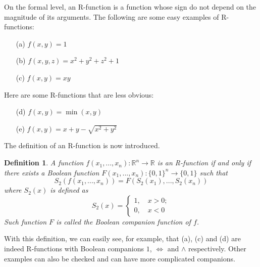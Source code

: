 \documentclass[11pt]{amsart}
\newtheorem{definition}{Definition}%
\theoremstyle{definition}
\begin{document}
On the formal level, an R-function is a function whose sign do not depend on the magnitude of its arguments.  The following are some easy  examples of R-functions: 
\begin{enumerate}
\item[(a)] $f(x,y) = 1$
\item[(b)] $f(x,y,z) = x^2+y^2+z^2+1$
\item[(c)] $f(x,y) = xy$
\end{enumerate}
Here are some R-functions that are less obvious:
\begin{enumerate}
\item[(d)] $f(x,y) = \min(x,y)$
\item[(e)] $f(x,y) = x+y-\sqrt{x^2+y^2}$
\end{enumerate}
The definition of an R-function is now introduced.
\begin{definition}
A function $f(x_1,...,x_n):\mathbb{R}^n\to\mathbb{R}$ is an R-function if and only if there exists a Boolean function $F(x_1,...,x_n):\{0,1\}^n\to \{0,1\}$ such that
$$S_2(f(x_1,...,x_n))=F(S_2(x_1),...,S_2(x_n))$$
where $S_2(x)$ is defined as
$$S_2(x)=\begin{cases} 1,\quad x>0;\\ 0, \quad x<0\end{cases}$$
Such function $F$ is called the Boolean companion function of $f$.
\end{definition}

With this definition, we can easily see, for example, that (a), (c) and (d) are indeed R-functions with Boolean companions $1$, $\Leftrightarrow$ and $\wedge$
respectively. Other examples can also be checked and can have more complicated
companions. 
\end{document}
